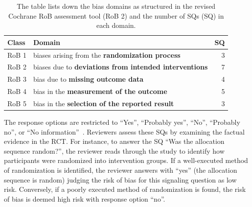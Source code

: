 \documentclass[sn-mathphys,Numbered]{sn-jnl}%
\theoremstyle{thmstyleone}%
\theoremstyle{thmstyletwo}%
\theoremstyle{thmstylethree}%
\begin{document}
%
%
%
\begin{table}
 \centering
   \caption{The table lists down the bias domains as structured in the revised Cochrane RoB assessment tool (RoB 2) and the number of SQs (SQ) in each domain.}\label{tab:robdomains}
    \begin{tabular}{llr}
    \toprule[1.0pt]
     Class & Domain & SQ\\
    \midrule[1.0pt]
    RoB 1 & biases arising from the \textbf{randomization process} &  3\\
    RoB 2 & biases due to \textbf{deviations from intended interventions} & 7\\
    RoB 3 & bias due to \textbf{missing outcome data} & 4\\
    RoB 4 & bias in the \textbf{measurement of the outcome} & 5\\
    RoB 5 & bias in the \textbf{selection of the reported result} & 3\\
    \bottomrule[1.0pt]
    \end{tabular}
\end{table}
%
%
%


The response options are restricted to ``Yes'', ``Probably yes'', ``No'', ``Probably no'', or ``No information''~\cite{sterne2019rob}.
Reviewers assess these SQs by examining the factual evidence in the RCT.
For instance, to answer the SQ ``Was the allocation sequence random?'', the reviewer reads through the study to identify how participants were randomized into intervention groups.
If a well-executed method of randomization is identified, the reviewer answers with ``yes'' (the allocation sequence is random) judging the risk of bias for this signaling question as low risk.
Conversely, if a poorly executed method of randomization is found, the risk of bias is deemed  high risk with response option ``no''.
\end{document}
